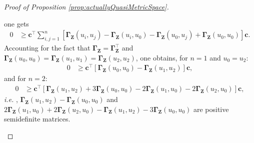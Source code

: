 \documentclass[12pt]{article}
\theoremstyle{plain}
\theoremstyle{remark}
\newcommand{\ie}{\textit{i.e. }}
\newcommand{\dVec}[1]{{\bm{#1}}}            %
\newcommand{\grMatr}[1]{{\boldsymbol{#1}}}   %
\begin{document}
\begin{proof}[Proof of Proposition \ref{prop:actuallyQuasiMetricSpace}]
\begin{enumerate}
{            one gets
            \begin{equation*}
                \begin{split}    
                    0 &\geq \dVec{c}^\top \sum_{i,j=1}^n  \left[\grMatr{\Gamma}_{{\bm{Z}}}(u_i,u_j)-\grMatr{\Gamma}_{{\bm{Z}}}(u_i,u_0)-\grMatr{\Gamma}_{{\bm{Z}}}(u_0,u_j)+\grMatr{\Gamma}_{{\bm{Z}}}(u_0,u_0)\right] \dVec{c}.
                \end{split}
            \end{equation*}
            Accounting for the fact that $\grMatr{\Gamma}_{{\bm{Z}}}=\grMatr{\Gamma}_{{\bm{Z}}}^\top$ and $\grMatr{\Gamma}_{{\bm{Z}}}(u_0,u_0)=\grMatr{\Gamma}_{{\bm{Z}}}(u_1,u_1)=\grMatr{\Gamma}_{{\bm{Z}}}(u_2,u_2)$, one obtains, for $n=1$ and $u_0=u_2$:
            \begin{equation*}
                \begin{split}    
                    0 &\geq \dVec{c}^\top \left[\grMatr{\Gamma}_{{\bm{Z}}}(u_0,u_0)-\grMatr{\Gamma}_{{\bm{Z}}}(u_1,u_2)\right] \dVec{c},
                \end{split}
            \end{equation*}  
            and for $n=2$:
            \begin{equation*}
                \begin{split}    
                    0 &\geq \dVec{c}^\top \left[\grMatr{\Gamma}_{{\bm{Z}}}(u_1,u_2)+3\grMatr{\Gamma}_{{\bm{Z}}}(u_0,u_0)-2\grMatr{\Gamma}_{{\bm{Z}}}(u_1,u_0)-2\grMatr{\Gamma}_{{\bm{Z}}}(u_2,u_0)\right] \dVec{c},
                \end{split}
            \end{equation*}
            \ie, $\grMatr{\Gamma}_{{\bm{Z}}}(u_1,u_2)-\grMatr{\Gamma}_{{\bm{Z}}}(u_0,u_0)$ and $2\grMatr{\Gamma}_{{\bm{Z}}}(u_1,u_0)+2\grMatr{\Gamma}_{{\bm{Z}}}(u_2,u_0)-\grMatr{\Gamma}_{{\bm{Z}}}(u_1,u_2)-3\grMatr{\Gamma}_{{\bm{Z}}}(u_0,u_0)$ are positive semidefinite matrices. %
            }
        \end{enumerate}
    \end{proof}
    
\end{document}

